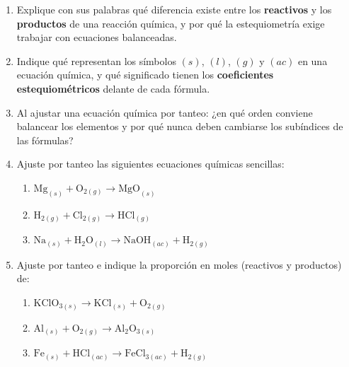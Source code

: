 \documentclass[12pt, letterpaper]{article}
\begin{document}
\begin{enumerate}[leftmargin=*, start=1]

  \item \facil{}\hspace{0.55em}Explique con sus palabras qué diferencia existe entre los \textbf{reactivos} y los \textbf{productos} de una reacción química, y por qué la estequiometría exige trabajar con ecuaciones balanceadas.

  \item \facil{}\hspace{0.55em}Indique qué representan los símbolos $(s)$, $(l)$, $(g)$ y $(ac)$ en una ecuación química, y qué significado tienen los \textbf{coeficientes estequiométricos} delante de cada fórmula.

  \item \facil{}\hspace{0.55em}Al ajustar una ecuación química por tanteo: ¿en qué orden conviene balancear los elementos y por qué nunca deben cambiarse los subíndices de las fórmulas?

  \item \facil{}\hspace{0.55em}Ajuste por tanteo las siguientes ecuaciones químicas sencillas:
        \begin{enumerate}[label=\alph*), leftmargin=1.8em, nosep, topsep=2pt]
          \item $\text{Mg}_{(s)} + \text{O}_{2(g)} \longrightarrow \text{MgO}_{(s)}$
          \item $\text{H}_{2(g)} + \text{Cl}_{2(g)} \longrightarrow \text{HCl}_{(g)}$
          \item $\text{Na}_{(s)} + \text{H}_2\text{O}_{(l)} \longrightarrow \text{NaOH}_{(ac)} + \text{H}_{2(g)}$
        \end{enumerate}

  \item \facil{}\hspace{0.55em}Ajuste por tanteo e indique la proporción en moles (reactivos y productos) de:
        \begin{enumerate}[label=\alph*), leftmargin=1.8em, nosep, topsep=2pt]
          \item $\text{KClO}_{3(s)} \longrightarrow \text{KCl}_{(s)} + \text{O}_{2(g)}$
          \item $\text{Al}_{(s)} + \text{O}_{2(g)} \longrightarrow \text{Al}_2\text{O}_{3(s)}$
          \item $\text{Fe}_{(s)} + \text{HCl}_{(ac)} \longrightarrow \text{FeCl}_{3(ac)} + \text{H}_{2(g)}$
        \end{enumerate}


\end{enumerate}
\end{document}
